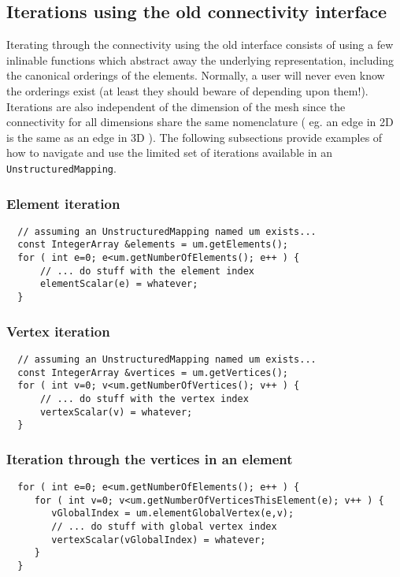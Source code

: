 \subsection{Iterations using the old connectivity interface}
Iterating through the connectivity using the old interface consists of using a few inlinable functions
which abstract away the underlying representation, including the canonical 
orderings of the elements.  Normally, a user will never even know the
orderings exist (at least they should beware of depending upon them!). Iterations
are also independent of the dimension of the mesh since the connectivity for
all dimensions share the same nomenclature ( eg. an edge in 2D is the same as 
an edge in 3D ).  The following subsections provide examples of how to 
navigate and use the limited set of iterations available in an {\tt UnstructuredMapping}.
\subsubsection{Element iteration}
{\footnotesize
\begin{verbatim}
  // assuming an UnstructuredMapping named um exists...
  const IntegerArray &elements = um.getElements();
  for ( int e=0; e<um.getNumberOfElements(); e++ ) {
      // ... do stuff with the element index
      elementScalar(e) = whatever;
  }
\end{verbatim}
}
\subsubsection{Vertex iteration}
{\footnotesize
\begin{verbatim}
  // assuming an UnstructuredMapping named um exists...
  const IntegerArray &vertices = um.getVertices();
  for ( int v=0; v<um.getNumberOfVertices(); v++ ) {
      // ... do stuff with the vertex index
      vertexScalar(v) = whatever;
  }
\end{verbatim}
}
\subsubsection{Iteration through the vertices in an element}
{\footnotesize
\begin{verbatim}
  for ( int e=0; e<um.getNumberOfElements(); e++ ) {
     for ( int v=0; v<um.getNumberOfVerticesThisElement(e); v++ ) {
        vGlobalIndex = um.elementGlobalVertex(e,v);
        // ... do stuff with global vertex index
        vertexScalar(vGlobalIndex) = whatever;
     }
  }
\end{verbatim}
}
